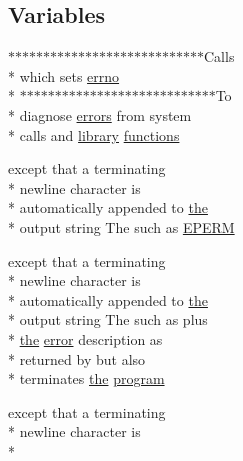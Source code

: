 \subsection*{Variables}
\begin{DoxyCompactItemize}
\item 
$\ast$$\ast$$\ast$$\ast$$\ast$$\ast$$\ast$$\ast$$\ast$$\ast$$\ast$$\ast$$\ast$$\ast$$\ast$$\ast$$\ast$$\ast$$\ast$$\ast$$\ast$$\ast$$\ast$$\ast$$\ast$$\ast$$\ast$$\ast$Calls \\*
which sets \hyperlink{common_2README_afe75ee0c7e5a90ba6bb38426ea69b996}{errno} \\*
$\ast$$\ast$$\ast$$\ast$$\ast$$\ast$$\ast$$\ast$$\ast$$\ast$$\ast$$\ast$$\ast$$\ast$$\ast$$\ast$$\ast$$\ast$$\ast$$\ast$$\ast$$\ast$$\ast$$\ast$$\ast$$\ast$$\ast$$\ast$To \\*
diagnose \hyperlink{common_2README_a9912daeb8cc621a6ee8e1d24ebdbe601}{errors} from system \\*
calls and \hyperlink{ClientServer_2server_2Makefile_a1f477410360bd4832116581b9934ab71}{library} \hyperlink{common_2README_a853571ba73c010b99ff2788a0cfe4395}{functions}
\item 
except that a terminating \\*
newline character is \\*
automatically appended to \hyperlink{ClientServer_2server_2Makefile_a09c6b60bb7451f9136e25140ffdff6bd}{the} \\*
output string The such as \hyperlink{common_2README_a9f655c76c94b7fe5fa4714a077ef4d7e}{E\-P\-E\-R\-M}
\item 
except that a terminating \\*
newline character is \\*
automatically appended to \hyperlink{ClientServer_2server_2Makefile_a09c6b60bb7451f9136e25140ffdff6bd}{the} \\*
output string The such as plus \\*
\hyperlink{ClientServer_2server_2Makefile_a09c6b60bb7451f9136e25140ffdff6bd}{the} \hyperlink{common_2README_a80171b13188418b4328f9247d3aff3d2}{error} description as \\*
returned by but also \\*
terminates \hyperlink{ClientServer_2server_2Makefile_a09c6b60bb7451f9136e25140ffdff6bd}{the} \hyperlink{common_2README_a2648c031e7768d2922f9bceca11215d9}{program}
\item 
except that a terminating \\*
newline character is \\*

\end{DoxyCompactItemize}
